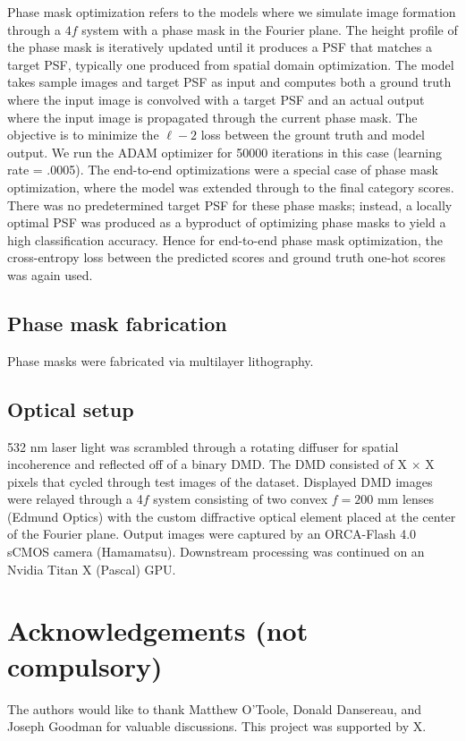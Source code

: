 \documentclass[fleqn,10pt]{wlscirep}
\begin{document}
Phase mask optimization refers to the models where we simulate image formation through a $4f$ system with a phase mask in the Fourier plane. The height profile of the phase mask is iteratively updated until it produces a PSF that matches a target PSF, typically one produced from spatial domain optimization. The model takes sample images and target PSF as input and computes both a ground truth where the input image is convolved with a target PSF and an actual output where the input image is propagated through the current phase mask. The objective is to minimize the $\ell-2$ loss between the grount truth and model output. We run the ADAM optimizer for 50000 iterations in this case (learning rate = .0005).  The end-to-end optimizations were a special case of phase mask optimization, where the model was extended through to the final category scores. There was no predetermined target PSF for these phase masks; instead, a locally optimal PSF was produced as a byproduct of optimizing phase masks to yield a high classification accuracy. Hence for end-to-end phase mask optimization, the cross-entropy loss between the predicted scores and ground truth one-hot scores was again used.

\subsection*{Phase mask fabrication}
Phase masks were fabricated via multilayer lithography.

\subsection*{Optical setup}
532 nm laser light was scrambled through a rotating diffuser for spatial incoherence and reflected off of a binary DMD. The DMD consisted of X $\times$ X pixels that cycled through test images of the dataset. Displayed DMD images were relayed through a 4$f$ system consisting of two convex $f = 200$ mm lenses (Edmund Optics) with the custom diffractive optical element placed at the center of the Fourier plane. Output images were captured by an ORCA-Flash 4.0 sCMOS camera (Hamamatsu). Downstream processing was continued on an Nvidia Titan X (Pascal) GPU.




\section*{Acknowledgements (not compulsory)}
The authors would like to thank Matthew O’Toole, Donald Dansereau, and Joseph Goodman for valuable discussions. This project was supported by X.
\end{document}
